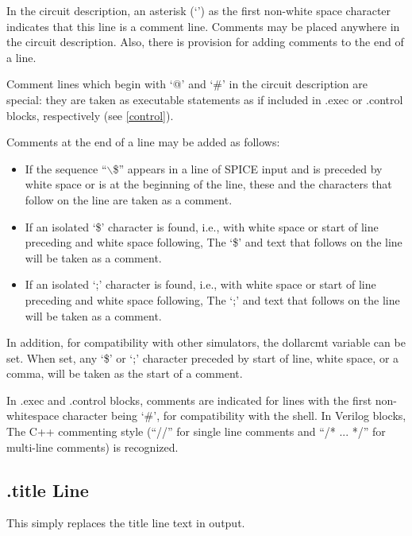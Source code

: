 In the circuit description, an asterisk (`{\vt *}') as the first
non-white space character indicates that this line is a comment line. 
Comments may be placed anywhere in the circuit description.  Also,
there is provision for adding comments to the end of a line.

Comment lines which begin with `{\vt *@}' and `{\vt *\#}' in the
circuit description are special:  they are taken as executable
statements as if included in {\vt .exec} or {\vt .control} blocks,
respectively (see \ref{control}).

Comments at the end of a line may be added as follows:
\begin{itemize}
\item{If the sequence ``{\vt $\backslash$\$}'' appears in a line of
  SPICE input and is preceded by white space or is at the beginning
  of the line, these and the characters that follow on the line are
  taken as a comment.}
\item{If an isolated `{\vt \$}' character is found, i.e., with
  white space or start of line preceding and white space
  following, The `{\vt \$}' and text that follows on the line
  will be taken as a comment.}
\item{If an isolated `{\vt ;}' character is found, i.e., with
  white space or start of line preceding and white space
  following, The `{\vt ;}' and text that follows on the line
  will be taken as a comment.}
\end{itemize}

In addition, for compatibility with other simulators, the {\et
dollarcmt} variable can be set.  When set, any `{\vt \$}' or `{\vt ;}'
character preceded by start of line, white space, or a comma, will be
taken as the start of a comment.

In {\vt .exec} and {\vt .control} blocks, comments are indicated for
lines with the first non-whitespace character being `{\vt \#}', for
compatibility with the shell.  In Verilog blocks, The C++ commenting
style (``{\vt //}'' for single line comments and ``{\vt /* ...  */}''
for multi-line comments) is recognized.

\subsection{{\vt .title} Line}

This simply replaces the title line text in output.

